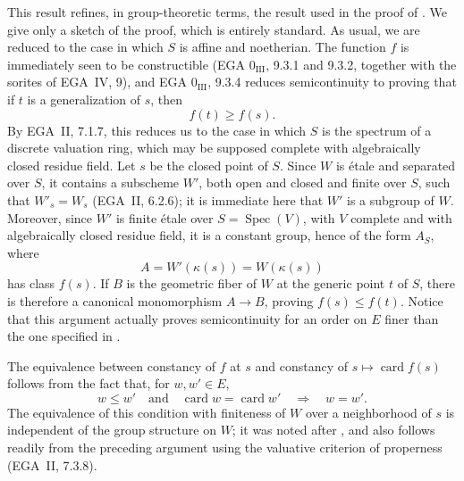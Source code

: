 This result refines, in group-theoretic terms, the result used in the
proof of . We give only a sketch of the proof, which is entirely
standard. As usual, we are reduced to the case in which \(S\) is
affine and noetherian. The function \(f\) is immediately seen to be
constructible (EGA \(0_{\mathrm{III}}\), 9.3.1 and 9.3.2, together
with the sorites of EGA~IV, 9), and EGA
\(0_{\mathrm{III}}\), 9.3.4 reduces semicontinuity to proving that if
\(t\) is a generalization of \(s\), then
\[
  f(t)\geq f(s).
\]
By EGA~II, 7.1.7, this reduces us to the case in which \(S\) is the
spectrum of a discrete valuation ring, which may be supposed complete
with algebraically closed residue field. Let \(s\) be the closed point
of \(S\). Since \(W\) is étale and separated over \(S\), it contains
a subscheme \(W'\), both open and closed and finite over \(S\), such
that \(W'_s=W_s\) (EGA~II, 6.2.6); it is immediate here that \(W'\)
is a subgroup of \(W\). Moreover, since \(W'\) is finite étale over
\(S=\operatorname{Spec}(V)\), with \(V\) complete and with
algebraically closed residue field, it is a constant group, hence of
the form \(A_S\), where
\[
  A=W'(\kappa(s))=W(\kappa(s))
\]
has class \(f(s)\). If \(B\) is the geometric fiber of \(W\) at the
generic point \(t\) of \(S\), there is therefore a canonical
monomorphism \(A\to B\), proving \(f(s)\leq f(t)\). Notice that this
argument actually proves semicontinuity for an order on \(E\) finer
than the one specified in .

The equivalence between constancy of \(f\) at \(s\) and constancy of
\(s\mapsto\operatorname{card}f(s)\) follows from the fact that, for
\(w,w'\in E\),
\[
  w\leq w'
  \quad\text{and}\quad
  \operatorname{card}w=\operatorname{card}w'
  \quad\Longrightarrow\quad
  w=w'.
\]
The equivalence of this condition with finiteness of \(W\) over a
neighborhood of \(s\) is independent of the group structure on
\(W\); it was noted after , and also follows readily from the
preceding argument using the valuative criterion of properness
(EGA~II, 7.3.8).

